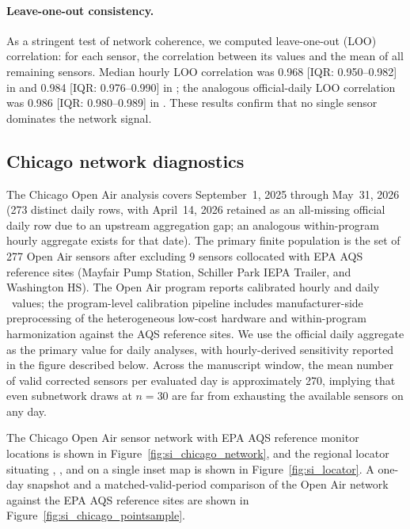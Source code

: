 \paragraph{Leave-one-out consistency.}
As a stringent test of network coherence, we computed leave-one-out (LOO) correlation: for each sensor, the correlation between its values and the mean of all remaining sensors. Median hourly LOO correlation was 0.968 [IQR: 0.950--0.982] in  and 0.984 [IQR: 0.976--0.990] in ; the analogous official-daily LOO correlation was 0.986 [IQR: 0.980--0.989] in . These results confirm that no single sensor dominates the network signal.

\subsection{Chicago network diagnostics}\label{sec:si_chicago_diagnostics}

The Chicago Open Air analysis covers September~1, 2025 through May~31, 2026 (273 distinct daily rows, with April~14, 2026 retained as an all-missing official daily row due to an upstream aggregation gap; an analogous within-program hourly aggregate exists for that date). The primary finite population is the set of 277 Open Air sensors after excluding 9 sensors collocated with EPA AQS reference sites (Mayfair Pump Station, Schiller Park IEPA Trailer, and Washington HS). The Open Air program reports calibrated hourly and daily \pmtt\ values; the program-level calibration pipeline includes manufacturer-side preprocessing of the heterogeneous low-cost hardware and within-program harmonization against the AQS reference sites. We use the official daily aggregate as the primary value for daily analyses, with hourly-derived sensitivity reported in the figure described below. Across the manuscript window, the mean number of valid corrected sensors per evaluated day is approximately 270, implying that even subnetwork draws at $n=30$ are far from exhausting the available sensors on any day.

The Chicago Open Air sensor network with EPA AQS reference monitor locations is shown in Figure~\ref{fig:si_chicago_network}, and the regional locator situating , , and  on a single inset map is shown in Figure~\ref{fig:si_locator}. A one-day snapshot and a matched-valid-period comparison of the Open Air network against the EPA AQS reference sites are shown in Figure~\ref{fig:si_chicago_pointsample}.

